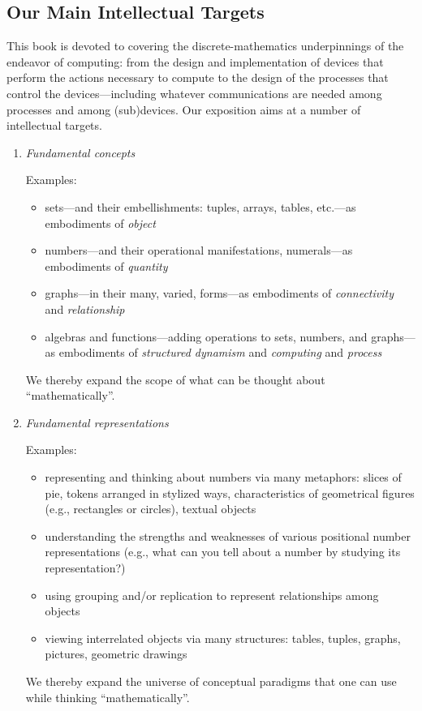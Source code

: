 \subsection{Our Main Intellectual Targets}
\label{sec:book-overwiew}

This book is devoted to covering the discrete-mathematics underpinnings of the endeavor of computing: from the design and implementation of devices that perform the actions necessary to
compute to the design of the processes that control the devices---including whatever communications are needed among processes and among (sub)devices.  Our exposition aims at a number of intellectual targets.
\begin{enumerate}
\item
{\it Fundamental concepts}

\medskip

{\small\sf Examples:}
\begin{itemize}
\item
sets---and their embellishments: tuples, arrays, tables, etc.---as embodiments of {\it object}
\medskip\item
numbers---and their operational manifestations, numerals---as embodiments of {\it quantity}
\medskip\item
graphs---in their many, varied, forms---as embodiments of {\it connectivity} and {\it relationship}
\medskip\item
algebras and functions---adding operations to sets, numbers, and graphs---as embodiments of {\it structured dynamism} and {\it computing} and {\it process}
\end{itemize}
We thereby expand the scope of what can be thought about ``mathematically''.

\medskip\item
{\it Fundamental representations}

\medskip

{\small\sf Examples:}
\begin{itemize}
\item
representing and thinking about numbers via many metaphors: slices of pie, tokens arranged in stylized ways, characteristics of geometrical figures (e.g., rectangles or circles), textual objects
\medskip\item
understanding the strengths and weaknesses of various positional number representations (e.g., what can you tell about a number by studying its representation?)
\medskip\item
using grouping and/or replication to represent relationships among objects
\medskip\item
viewing interrelated objects via many structures: tables, tuples, graphs, pictures, geometric drawings
\end{itemize}
We thereby expand the universe of conceptual paradigms that one can use while thinking ``mathematically''.


\end{enumerate}
